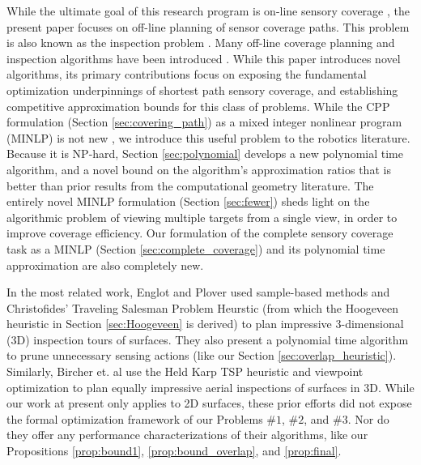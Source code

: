 \documentclass[letterpaper, 10 pt, conference]{ieeeconf}
\theoremstyle{definition}
\begin{document}
While the ultimate goal of this research program is on-line sensory coverage \cite{zelinsky_planning_1993,?,?}, the present paper focuses on off-line planning of sensor coverage paths.  This problem is also known as the inspection problem \cite{?,?z}.  Many off-line coverage planning and inspection algorithms have been introduced \cite{?,?,?}.  While this paper introduces novel algorithms, its primary contributions focus on exposing the fundamental optimization underpinnings of shortest path sensory coverage, and establishing competitive approximation bounds for this class of problems.  While the CPP formulation (Section \ref{sec:covering_path}) as a mixed integer nonlinear program  (MINLP) is not new \cite{current_covering_1989,current_efficient_1994,golden_generalized_2012}, we introduce this useful problem to the robotics literature. Because it is NP-hard, Section \ref{sec:polynomial} develops a new polynomial time algorithm, and a novel bound on the algorithm's approximation ratios that is  better than prior results from the computational geometry literature.  The entirely novel MINLP formulation (Section \ref{sec:fewer}) sheds light on the algorithmic problem of viewing multiple targets from a single view, in order to improve coverage efficiency. Our formulation of the complete sensory coverage task as a MINLP (Section \ref{sec:complete_coverage}) and its polynomial time approximation are also completely new.

In the most related work, Englot and Plover \cite{englot_three-dimensional_2013,christensen_planning_2017} used sample-based methods and Christofides' Traveling Salesman Problem Heurstic (from which the Hoogeveen heuristic in Section \ref{sec:Hoogeveen} is derived) to plan impressive 3-dimensional (3D) inspection tours of surfaces.  They also present a polynomial time algorithm to prune unnecessary sensing actions (like our Section \ref{sec:overlap_heuristic}). Similarly, Bircher et. al \cite{bircher_3D} use the Held Karp TSP heuristic and viewpoint optimization to plan equally impressive aerial inspections of surfaces in 3D. While our work at present only applies to 2D surfaces, these prior efforts did not expose the formal optimization framework of our Problems $\# 1$, $\#2$, and $\# 3$.  Nor do they offer any performance characterizations of their algorithms, like our Propositions \ref{prop:bound1}, \ref{prop:bound_overlap}, and \ref{prop:final}.  
\end{document}

